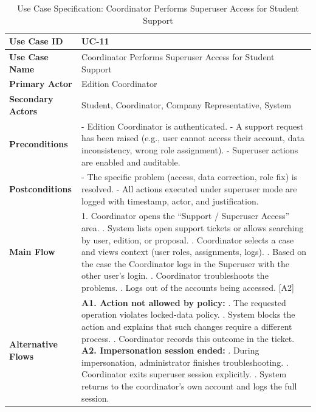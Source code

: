 \newpage
\renewcommand{\arraystretch}{1.5} 
\begin{xltabular}{\textwidth}{|l|X|}
    \caption{Use Case Specification: Coordinator Performs Superuser Access for Student Support} \label{tab:UC-12} \\
    
    \hline
    \textbf{Use Case ID} & UC-11 \\ \hline
    \textbf{Use Case Name} & Coordinator Performs Superuser Access for Student Support \\ \hline
    \textbf{Primary Actor} & Edition Coordinator \\ \hline
    \textbf{Secondary Actors} & Student, Coordinator, Company Representative, System \\ \hline
    \textbf{Preconditions} &
        - Edition Coordinator is authenticated. \newline
        - A support request has been raised (e.g., user cannot access their account, data inconsistency, wrong role assignment). \newline
        - Superuser actions are enabled and auditable.
        \\ \hline
    \textbf{Postconditions} &
        - The specific problem (access, data correction, role fix) is resolved. \newline
        - All actions executed under superuser mode are logged with timestamp, actor, and justification.
        \\ \hline
    \textbf{Main Flow} &
        1. Coordinator opens the “Support / Superuser Access” area. . System lists open support tickets or allows searching by user, edition, or proposal. . Coordinator selects a case and views context (user roles, assignments, logs). . Based on the case the Coordinator logs in the Superuser with the other user's login. . Coordinator troubleshoots the problems. . Logs out of the accounts being accessed. [A2] \\ \hline 
    \textbf{Alternative Flows} &
        \textbf{A1. Action not allowed by policy:} . The requested operation violates locked-data policy. . System blocks the action and explains that such changes require a different process. . Coordinator records this outcome in the ticket. \newline
        \textbf{A2. Impersonation session ended:} . During impersonation, administrator finishes troubleshooting. . Coordinator exits superuser session explicitly. . System returns to the coordinator's own account and logs the full session. \\ \hline
\end{xltabular}
